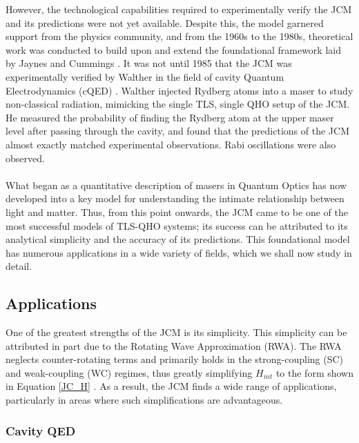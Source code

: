 \documentclass[12pt,a4paper]{article}
\begin{document}
However, the technological capabilities required to experimentally verify the JCM and its predictions were not yet available. Despite this, the model garnered support from the physics community, and from the 1960s to the 1980s, theoretical work was conducted to build upon and extend the foundational framework laid by Jaynes and Cummings \cite{Context1965-TheoreticalJCM, Context1980-TheoreticalJCM, Context1984-TheoreticalJCM}. It was not until 1985 that the JCM was experimentally verified by Walther in the field of cavity Quantum Electrodynamics (cQED) \cite{Context1993-JC_Verification}. Walther injected Rydberg atoms into a maser to study non-classical radiation, mimicking the single TLS, single QHO setup of the JCM. He measured the probability of finding the Rydberg atom at the upper maser level after passing through the cavity, and found that the predictions of the JCM almost exactly matched experimental observations. Rabi oscillations were also observed.\\
\\
What began as a quantitative description of masers in Quantum Optics has now developed into a key model for understanding the intimate relationship between light and matter. Thus, from this point onwards, the JCM came to be one of the most successful models of TLS-QHO systems; its success can be attributed to its analytical simplicity and the accuracy of its predictions. This foundational model has numerous applications in a wide variety of fields, which we shall now study in detail.

\subsection{Applications} \label{JCM_apps}

One of the greatest strengths of the JCM is its simplicity. This simplicity can be attributed in part due to the Rotating Wave Approximation (RWA). The RWA neglects counter-rotating terms and primarily holds in the strong-coupling (SC) and weak-coupling (WC) regimes, thus greatly simplifying $H_{int}$ to the form shown in Equation \eqref{JC_H} \cite{General2010_USC_failure}. As a result,  the JCM finds a wide range of applications, particularly in areas where such simplifications are advantageous.

\subsubsection{Cavity QED} \label{subsubsec_cQED}
\end{document}
